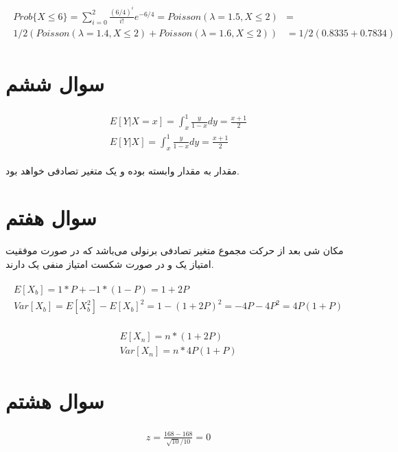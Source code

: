 \documentclass[paper=a4, fontsize=11pt]{article}
\numberwithin{equation}{section} %
\numberwithin{figure}{section} %
\numberwithin{table}{section} %
\begin{document}
\begin{align}
\begin{split}
    Prob\{X \le 6\} = \sum_{i=0}^{2} \frac{(6/4)^i}{i!} e^{-6/4} = Poisson(\lambda = 1.5, X \le 2) &=\\
    1/2 (Poisson(\lambda = 1.4, X \le 2) + Poisson(\lambda = 1.6, X \le 2)) &= 1/2(0.8335 + 0.7834)
\end{split}
\end{align}

\section{سوال ششم}
\begin{align}
\begin{split}
    E[Y|X = x] = \int_{x}^{1} \frac{y}{1-x} dy = \frac{x + 1}{2} \\
    E[Y|X] = \int_{x}^{1} \frac{y}{1-x} dy = \frac{x + 1}{2}
\end{split}
\end{align}

مقدار 
به مقدار  وابسته بوده و یک متغیر تصادفی خواهد بود.


\section{سوال هفتم}

مکان شی بعد از 
حرکت مجموع 
متغیر تصادفی برنولی می‌باشد که
در صورت موفقیت امتیاز یک و در صورت شکست امتیاز منفی یک دارند.

\begin{align}
\begin{split}
    E[X_b] = 1 * P + -1 * (1 - P) =  1 + 2P\\
    Var[X_b] = E[X_b^2] - E[X_b]^2 = 1 - (1 + 2P)^2 = -4P - 4P^2 = 4P(1 + P)
\end{split}
\end{align}

\begin{align}
\begin{split}
    E[X_n] = n * (1 + 2P) \\
    Var[X_n] = n * 4P(1 + P)
\end{split}
\end{align}


\section{سوال هشتم}

\begin{align}
\begin{split}
    z = \frac{168 - 168}{\sqrt{10}/10} = 0
\end{split}
\end{align}
\end{document}
